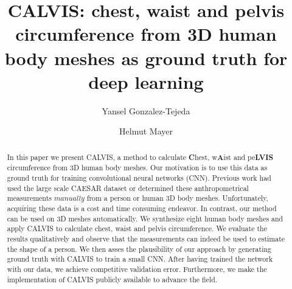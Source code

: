 \documentclass[runningheads, orivec]{llncs}
\begin{document}
%
\title{CALVIS: chest, waist and pelvis circumference from 3D human body meshes	
as ground truth for deep learning}
%
%
\author{Yansel Gonzalez-Tejeda \and
	Helmut Mayer}
%
%
%
\maketitle              %
%
\begin{abstract}
In this paper we present CALVIS, a method to calculate \textbf{C}hest, 
w\textbf{A}ist and pe\textbf{LVIS} circumference from 3D human body meshes. Our 
motivation is to use 
this data as ground truth for training convolutional neural networks 
(CNN). Previous work had used the large scale CAESAR dataset or determined 
these anthropometrical measurements $\textit{manually}$ from a person 
or human 3D body meshes. 
Unfortunately, acquiring these data is a cost and 
time consuming endeavor. In contrast, our method can be used on 
3D meshes automatically. We synthesize eight human body meshes and 
apply 
CALVIS to calculate chest, waist and pelvis circumference. We evaluate the 
results qualitatively and observe that the measurements can indeed be used 
to estimate the shape of a person. We then asses the 
plausibility of our approach by generating
ground truth with CALVIS to train a small CNN. After
having trained the network with 
our data, we achieve competitive validation error.
Furthermore, we make the implementation of CALVIS publicly available to 
advance the field.

\end{abstract}
%
%
%
\end{document}
